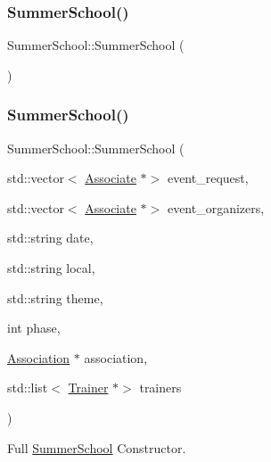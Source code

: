 \subsubsection{\texorpdfstring{Summer\+School()}{SummerSchool()}\hspace{0.1cm}{\footnotesize\ttfamily [1/3]}}
{\footnotesize\ttfamily Summer\+School\+::\+Summer\+School (\begin{DoxyParamCaption}{ }\end{DoxyParamCaption})}

\mbox{\label{classSummerSchool_a108aeb7981fbb9e6dbe44c1425517ddf}} 
\subsubsection{\texorpdfstring{Summer\+School()}{SummerSchool()}\hspace{0.1cm}{\footnotesize\ttfamily [2/3]}}
{\footnotesize\ttfamily Summer\+School\+::\+Summer\+School (\begin{DoxyParamCaption}\item[{std\+::vector$<$ \mbox{\hyperlink{classAssociate}{Associate}} $\ast$$>$}]{event\+\_\+request,  }\item[{std\+::vector$<$ \mbox{\hyperlink{classAssociate}{Associate}} $\ast$$>$}]{event\+\_\+organizers,  }\item[{std\+::string}]{date,  }\item[{std\+::string}]{local,  }\item[{std\+::string}]{theme,  }\item[{int}]{phase,  }\item[{\mbox{\hyperlink{classAssociation}{Association}} $\ast$}]{association,  }\item[{std\+::list$<$ \mbox{\hyperlink{classTrainer}{Trainer}} $\ast$$>$}]{trainers }\end{DoxyParamCaption})}



Full \mbox{\hyperlink{classSummerSchool}{Summer\+School}} Constructor. 


